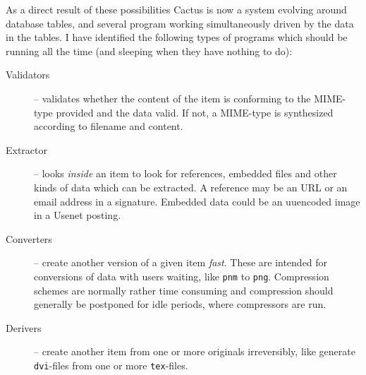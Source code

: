 As a direct result of these possibilities Cactus is now a system
evolving around database tables, and several program working
simultaneously driven by the data in the tables.  I have identified
the following types of programs which should be running all the time
(and sleeping when they have nothing to do):

\begin{description}
  
\item[Validators] -- validates whether the content
  of the item is conforming to the MIME-type provided and
  the data valid.  If not, a MIME-type is synthesized
  according to filename and content.

  

  
\item[Extractor] -- looks \textit{inside} an item to look
  for references, embedded files and other kinds of data
  which can be extracted.  A reference may be an URL or an
  email address in a signature.  Embedded data could be an
  uuencoded image in a Usenet posting.
  
\item[Converters] -- create another version of a given item
  \textit{fast}.  These are intended for conversions of data
  with users waiting, like \texttt{pnm} to \texttt{png}.
  Compression schemes are normally rather time consuming and
  compression should generally be postponed for idle
  periods, where compressors are run.


  
\item[Derivers] -- create another item from one or more
  originals irreversibly, like generate \texttt{dvi}-files
  from one or more \texttt{tex}-files.



\end{description}
